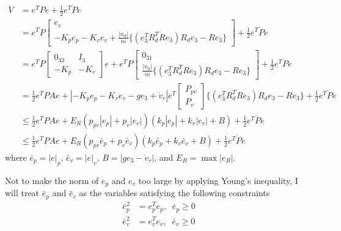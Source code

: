 \documentclass{article}
\begin{document}
\begin{align}
\dot{V} &= e^TP\dot{e} + \frac{1}{2}e^T\dot{P}e\nonumber \\
&= e^TP\left[
\begin{array}{l}
e_v \\ -K_pe_p -K_ve_v + \frac{|n_d|}{m}\{(e_3^TR_d^TRe_3)R_de_3-Re_3\} 
\end{array}
\right] +\frac{1}{2}e^T\dot{P}e\nonumber \\
&= e^TP\left[
\begin{array}{cc}
0_{33} & I_3 \\ -K_p & -K_v
\end{array}
\right]e + 
e^TP\left[
\begin{array}{c}
0_{31} \\ \frac{|n_d|}{m}\{(e_3^TR_d^TRe_3)R_de_3-Re_3\} 
\end{array}
\right] +\frac{1}{2}e^T\dot{P}e\nonumber \\
&= \frac{1}{2}e^TPAe + |-K_p e_p -K_v e_v - ge_3 + \dot{v}_r|e^T
\left[
\begin{array}{c}
P_{pv} \\ P_v
\end{array}
\right]
\{(e_3^TR_d^TRe_3)R_de_3-Re_3\} +\frac{1}{2}e^T\dot{P}e\nonumber \\
&\leq \frac{1}{2}e^TPAe+ E_R(p_{pv}|e_p|+p_v|e_v|)(k_p|e_p|+k_v|e_v|+B)+\frac{1}{2}e^T\dot{P}e \nonumber  \\
&\leq \frac{1}{2}e^TPAe+ E_R(p_{pv}\bar{e}_p+p_v\bar{e}_v)(k_p\bar{e}_p+k_v\bar{e}_v+B)+\frac{1}{2}e^T\dot{P}e \nonumber
\end{align}
where $\bar{e}_p = |e|_p$, $\bar{e}_v = |e|_v$, $B = |ge_3-\dot{v}_r|$, and $E_R = \max|e_R|$.

Not to make the norm of $e_p$ and $e_v$ too large by applying Young's inequality, I will treat $\bar{e}_p$ and $\bar{e}_v$ as the variables satisfying the following constraints
\begin{align}
\bar{e}_p^2 &= e_p^Te_p,\;\;\bar{e}_p \geq 0 \nonumber \\
\bar{e}_v^2 &= e_v^Te_v,\;\;\bar{e}_v \geq 0 \nonumber
\end{align}
\end{document}
